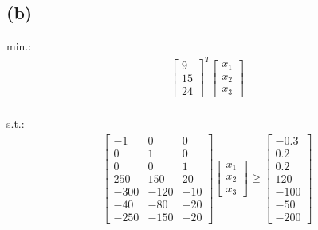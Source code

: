 \documentclass[a4paper]{scrartcl}
\begin{document}
\subsection*{(b)}
min.:\\
\begin{align}
	\begin{bmatrix}
	9\\
	15\\
	24
	\end{bmatrix}^T
		\begin{bmatrix}
	x_1\\
	x_2\\
	x_3
	\end{bmatrix}
\end{align}\\
s.t.:\\
\begin{align}
	\begin{bmatrix} 
		-1 & 0 & 0 \\
		0 & 1 & 0 \\
		0 & 0 & 1\\
		250 & 150 & 20\\
		-300 & -120 & -10\\
		-40 & -80 & -20\\
		-250 & -150 &-20
	\end{bmatrix}
			\begin{bmatrix}
	x_1\\
	x_2\\
	x_3
	\end{bmatrix}
	\geq
			\begin{bmatrix}
	-0.3\\
	0.2\\
	0.2\\
	120\\
	-100\\
	-50\\
	-200
	\end{bmatrix}
\end{align}
\end{document}

